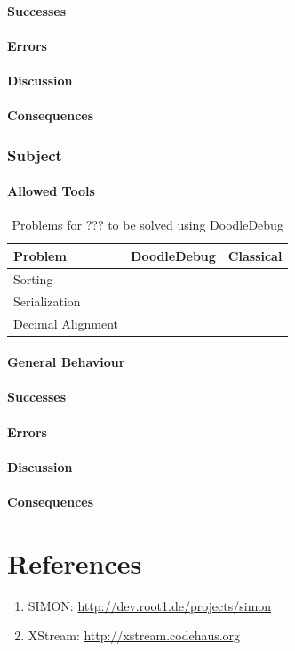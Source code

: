 \documentclass[a4paper,ngerman,english]{amsbook} %
\begin{document}
\subsubsection*{Successes}
\subsubsection*{Errors}
\subsubsection*{Discussion}
\subsubsection*{Consequences}

\subsection*{Subject}
\subsubsection*{Allowed Tools}
\begin{table}[h]
\centering
\begin{tabular}{l c c}
{\bf Problem} & {\bf DoodleDebug} & {\bf Classical} \\ \hline
Sorting &  &  \\
Serialization &  &  \\
Decimal Alignment &  &  \\
\end{tabular}
\caption{Problems for ??? to be solved using DoodleDebug}
\end{table}
\subsubsection*{General Behaviour}
\subsubsection*{Successes}
\subsubsection*{Errors}
\subsubsection*{Discussion}
\subsubsection*{Consequences}

\chapter*{References}
\begin{enumerate}
\item
SIMON: \url{http://dev.root1.de/projects/simon}
\item
XStream: \url{http://xstream.codehaus.org}
\end{enumerate}
\end{document}

